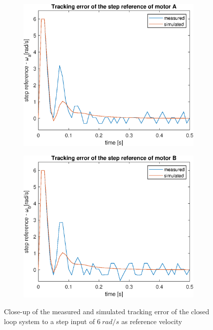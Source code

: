 \documentclass[a4paper,kul]{kulakarticle} %
\begin{document}
\begin{figure}[htp!]
	\centering
	\begin{subfigure}[b]{0.49\textwidth}
		\centering
		\includegraphics[width=\linewidth]{trackingerror_stepresponseA_zoom.eps}
		
	\end{subfigure}
	\hfill
	\begin{subfigure}[b]{0.49\textwidth}  
		\centering
		\includegraphics[width=\linewidth]{trackingerror_stepresponseB_zoom.eps}
		
	\end{subfigure}
	\caption{Close-up of the measured and simulated tracking error of the closed loop system to a step input of $\SI{6}{rad/s}$ as reference velocity}
	\label{fig:trackingerrorstepresponsezoom}
\end{figure}
\end{document}
